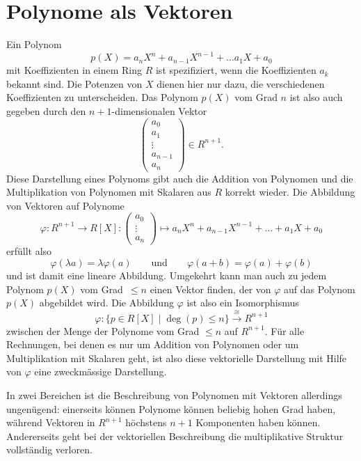 %
%
%
\section{Polynome als Vektoren
\label{buch:section:polynome:vektoren}}
Ein Polynom
\[
p(X) = a_nX^n + a_{n-1}X^{n-1} + \dots a_1X+a_0
\]
mit Koeffizienten in einem Ring $R$
ist spezifiziert, wenn die Koeffizienten $a_k$ bekannt sind.
Die Potenzen von $X$ dienen hier nur dazu, die verschiedenen
Koeffizienten zu unterscheiden.
Das Polynom $p(X)$ vom Grad $n$ ist also auch gegeben durch den
$n+1$-dimensionalen Vektor
\[
\begin{pmatrix}
a_0\\
a_1\\
\vdots\\
a_{n-1}\\
a_{n}
\end{pmatrix}
\in
R^{n+1}.
\]
Diese Darstellung eines Polynoms gibt auch die Addition von Polynomen
und die Multiplikation von Polynomen mit Skalaren aus $R$ korrekt wieder.
Die Abbildung von Vektoren auf Polynome
\[
\varphi
\colon  R^{n+1} \to R[X]
:
\begin{pmatrix}a_0\\\vdots\\a_n\end{pmatrix}
\mapsto
a_nX^n + a_{n-1}X^{n-1}+\dots+a_1X+a_0
\]
erfüllt also
\[
\varphi( \lambda a) = \lambda \varphi(a)
\qquad\text{und}\qquad
\varphi(a+b) = \varphi(a) + \varphi(b)
\]
und ist damit eine lineare Abbildung.
Umgekehrt kann man auch zu jedem Polynom $p(X)$ vom Grad~$\le n$ einen
Vektor finden, der von $\varphi$ auf das Polynom $p(X)$ abgebildet wird.
Die Abbildung $\varphi$ ist also ein Isomorphismus
\[
\varphi
\colon
\{p\in R[X] \mid \deg(p) \le n\}
\overset{\cong}{\to}
R^{n+1}
\]
zwischen der Menge
der Polynome vom Grad $\le n$ auf $R^{n+1}$.
Für alle Rechnungen, bei denen es nur um Addition von Polynomen oder
um Multiplikation mit Skalaren geht, ist also diese vektorielle Darstellung
mit Hilfe von $\varphi$ eine zweckmässige Darstellung.

In zwei Bereichen ist die Beschreibung von Polynomen mit Vektoren allerdings
ungenügend: einerseits können Polynome können beliebig hohen Grad haben,
während Vektoren in $R^{n+1}$ höchstens $n+1$ Komponenten haben können.
Andererseits geht bei der vektoriellen Beschreibung die multiplikative
Struktur vollständig verloren.

